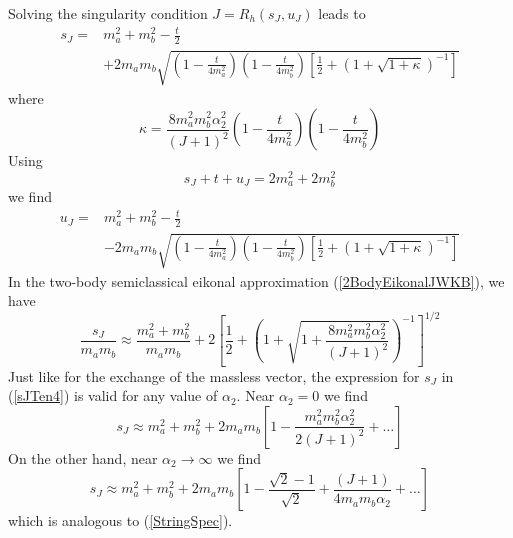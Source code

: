Solving the singularity condition $J = R_{h}(s_{J}, u_{J})$ leads to
\begin{equation}
\begin{split}
	s_{J} = &{} m_{a}^{2} + m_{b}^{2} - \frac{t}{2} \\
	&+ 2 m_{a} m_{b} \sqrt{\left(1 - \frac{t}{4m_{a}^{2}} \right)\left(1 - \frac{t}{4m_{b}^{2}} \right)\left[ \frac{1}{2} + \left(1 + \sqrt{1 + \kappa} \right)^{-1} \right]}
\end{split}
\end{equation}
where
\begin{equation}
	\kappa = \frac{8 m_{a}^{2} m_{b}^{2} \alpha_{2}^{2}}{(J+1)^{2}} \left(1 - \frac{t}{4m_{a}^{2}} \right)\left(1 - \frac{t}{4m_{b}^{2}} \right)
\end{equation}
Using
\begin{equation}
	s_{J} + t + u_{J} = 2m_{a}^{2} + 2m_{b}^{2}
\end{equation}
we find
\begin{equation}
\begin{split}
	u_{J} = &{} m_{a}^{2} + m_{b}^{2} - \frac{t}{2} \\
	&- 2 m_{a} m_{b} \sqrt{\left(1 - \frac{t}{4m_{a}^{2}} \right)\left(1 - \frac{t}{4m_{b}^{2}} \right)\left[ \frac{1}{2} + \left(1 + \sqrt{1 + \kappa} \right)^{-1} \right]}
\end{split}
\end{equation}
In the two-body semiclassical eikonal approximation (\ref{2BodyEikonalJWKB}), we have
\begin{equation}
	\frac{s_{J}}{m_{a} m_{b}} \approx \frac{m_{a}^{2} + m_{b}^{2}}{m_{a} m_{b}} + 2 \left[ \frac{1}{2} + \left(1 + \sqrt{1 + \frac{8 m_{a}^{2} m_{b}^{2} \alpha_{2}^{2}}{(J + 1)^{2}}} \right)^{-1} \right]^{1/2} \label{sJTen4}
\end{equation}
Just like for the exchange of the massless vector, the expression for $s_{J}$ in (\ref{sJTen4}) is valid for any value of $\alpha_{2}$. Near $\alpha_{2} = 0$ we find
\begin{equation}
	s_{J} \approx m_{a}^{2} + m_{b}^{2} + 2 m_{a} m_{b} \left[1 - \frac{m_{a}^{2} m_{b}^{2} \alpha_{2}^{2}}{2(J + 1)^{2}} + \ldots \right]
\end{equation}
On the other hand, near $\alpha_{2} \rightarrow \infty$ we find
\begin{equation}
	s_{J} \approx m_{a}^{2} + m_{b}^{2} + 2 m_{a} m_{b} \left[ 1 - \frac{\sqrt{2} - 1}{\sqrt{2}} + \frac{(J + 1)}{4 m_{a} m_{b} \alpha_{2}} + \ldots \right]
\end{equation}
which is analogous to (\ref{StringSpec}).